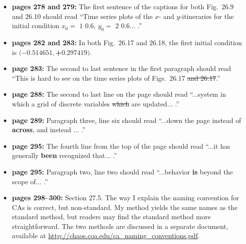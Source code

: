 \documentclass[12pt]{article}
\begin{document}
\begin{itemize}

  \item {\bf pages 278 and 279:}  The first sentence of the captions
    for both Fig.~26.9 and 26.10 should read ``Time series plots of
    the $x$- and $y$-itineraries for the initial condition $x_0 =$
    \sout{$1$} {\bf $0.6$}, $y_0 =$ \sout{$2$} {\bf $0.6$}... .''


  \item {\bf pages 282 and 283:}  In both Fig.~26.17 and 26.18, the
    first initial condition is $(-0.514651, ${\bf+}$0.297419)$.  

  \item {\bf page 283:}  The second to last sentence in the first
    paragraph should read ``This is hard to see on the time series
    plots of Figs.~26.17 \sout{and 26.17}.''


  \item {\bf page 288:} The second to last line on the page should
    read ``...system in which a grid of discrete variables
    \sout{which} are updated... .''

  \item {\bf page 289:} Paragraph three, line six should read
    ``...down the page instead of {\bf across}, and instead ... .'' 

  \item {\bf page 295:} The fourth line from the top of the page
    should read ``...it has generally {\bf been} recognized
    that... .'' 

  \item {\bf page 295:} Paragraph two, line two should read
    ``...behavior {\bf is} beyond the scope of... .''

  \item {\bf pages 298--300:}  Section 27.5.  The way I explain the
    naming convention for CAs is correct, but non-standard.  My method
    yields the same names as the standard method, but readers may find
    the standard method more straightforward.  The two methods are
    discussed in a separate document, available at
    \url{http://chaos.coa.edu/ca_naming_conventions.pdf}. 


\end{itemize}
\end{document}
